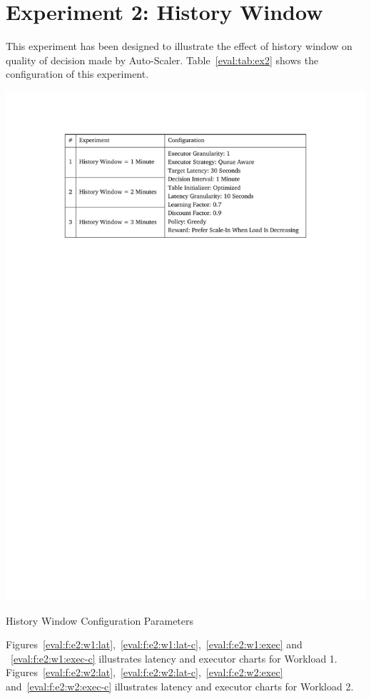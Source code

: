 \section{Experiment 2: History Window}
This experiment has been designed to illustrate the effect of history window on quality of decision made by Auto-Scaler. Table~\ref{eval:tab:ex2} shows the configuration of this experiment.
\begin{table}[h]
    \includegraphics[clip,trim=3.3cm 21.18cm 3.25cm 2.5cm]{tables/ex2.pdf}
    \centering
    \caption{History Window Configuration Parameters}
    \label{eval:tab:ex2}
\end{table}

Figures~\ref{eval:f:e2:w1:lat},~\ref{eval:f:e2:w1:lat-c},~\ref{eval:f:e2:w1:exec} and ~\ref{eval:f:e2:w1:exec-c} illustrates latency and executor charts for Workload 1. Figures~\ref{eval:f:e2:w2:lat},~\ref{eval:f:e2:w2:lat-c},~\ref{eval:f:e2:w2:exec} and~\ref{eval:f:e2:w2:exec-c} illustrates latency and executor charts for Workload 2.

